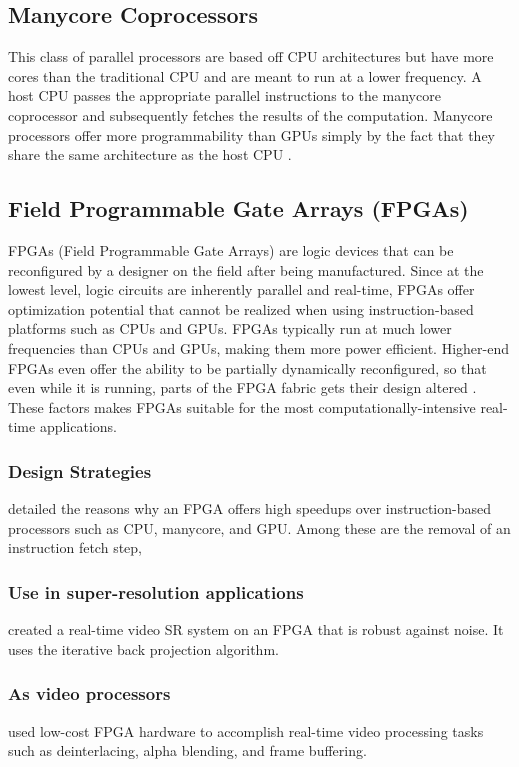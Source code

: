 \subsection{Manycore Coprocessors}
This class of parallel processors are based off CPU architectures but have more cores than the traditional CPU and are meant to run at a lower frequency. 
A host CPU passes the appropriate parallel instructions to the manycore coprocessor and subsequently fetches the results of the computation.
Manycore processors offer more programmability than GPUs simply by the fact that they share the same architecture as the host CPU \citep{Ishizaka2013}.

\subsection{Field Programmable Gate Arrays (FPGAs)}
FPGAs (Field Programmable Gate Arrays) are logic devices that can be reconfigured by a designer on the field after being manufactured.
Since at the lowest level, logic circuits are inherently parallel and real-time, FPGAs offer optimization potential that cannot be realized when using instruction-based platforms such as CPUs and GPUs. FPGAs typically run at much lower frequencies than CPUs and GPUs, making them more power efficient.
Higher-end FPGAs even offer the ability to be partially dynamically reconfigured, so that even while it is running, parts of the FPGA fabric gets their design altered \citep{Dye2012}.
These factors makes FPGAs suitable for the most computationally-intensive real-time applications.

\subsubsection{Design Strategies}
\cite{Sirowy2008} detailed the reasons why an FPGA offers high speedups over instruction-based processors such as CPU, manycore, and GPU. 
Among these are the removal of an instruction fetch step, 

\subsubsection{Use in super-resolution applications}

\cite{Angelopoulou2009} created a real-time video SR system on an FPGA that is robust against noise. It uses the iterative back projection algorithm. 

\subsubsection{As video processors}
\cite{Roth2011} used low-cost FPGA hardware to accomplish real-time video processing tasks such as deinterlacing, alpha blending, and frame buffering.